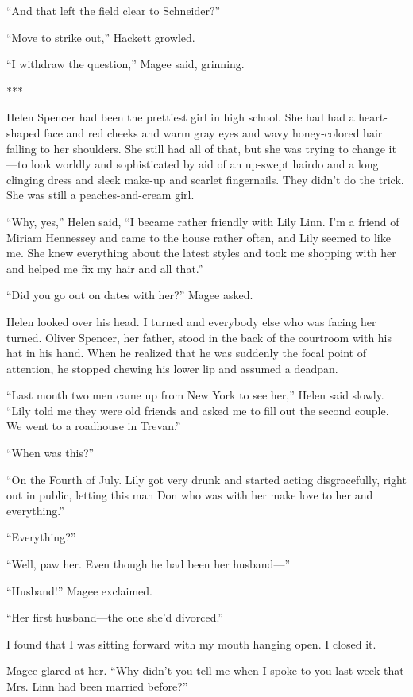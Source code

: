 {“And that left the field clear to Schneider?”

“Move to strike out,” Hackett growled.

“I withdraw the question,” Magee said, grinning.

***

Helen Spencer had been the prettiest girl in high school. She had had a heart-shaped face and red cheeks and warm gray eyes and wavy honey-colored hair falling to her shoulders. She still had all of that, but she was trying to change it—to look worldly and sophisticated by aid of an up-swept hairdo and a long clinging dress and sleek make-up and scarlet fingernails. They didn’t do the trick. She was still a peaches-and-cream girl.

“Why, yes,” Helen said, “I became rather friendly with Lily Linn. I’m a friend of Miriam Hennessey and came to the house rather often, and Lily seemed to like me. She knew everything about the latest styles and took me shopping with her and helped me fix my hair and all that.”

“Did you go out on dates with her?” Magee asked.

Helen looked over his head. I turned and everybody else who was facing her turned. Oliver Spencer, her father, stood in the back of the courtroom with his hat in his hand. When he realized that he was suddenly the focal point of attention, he stopped chewing his lower lip and assumed a deadpan.

“Last month two men came up from New York to see her,” Helen said slowly. “Lily told me they were old friends and asked me to fill out the second couple. We went to a roadhouse in Trevan.”

“When was this?”

“On the Fourth of July. Lily got very drunk and started acting disgracefully, right out in public, letting this man Don who was with her make love to her and everything.”

“Everything?”

“Well, paw her. Even though he had been her husband—”

“Husband!” Magee exclaimed.

“Her first husband—the one she’d divorced.”

I found that I was sitting forward with my mouth hanging open. I closed it.

Magee glared at her. “Why didn’t you tell me when I spoke to you last week that Mrs. Linn had been married before?”

}
